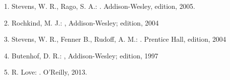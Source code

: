 \begin{slide}
\begin{enumerate}
\item Stevens, W. R., Rago, S. A.: . Addison-Wesley,  edition, 2005.
\item Rochkind, M. J.: ,
Addison-Wesley;  edition, 2004
\item Stevens, W. R., Fenner B., Rudoff, A. M.: . Prentice Hall,
 edition, 2004
\item Butenhof, D. R.: ,
Addison-Wesley;  edition, 1997
\item R. Love: . O'Reilly, 2013.
\end{enumerate}
\end{slide}


